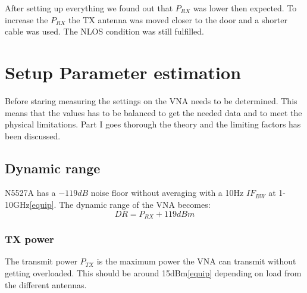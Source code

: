 After setting up everything we found out that $P_{RX}$ was lower then expected. To increase the $P_{RX}$ the TX antenna was moved closer to the door and a shorter cable was used. The NLOS condition was still fulfilled. 

%
%


\chapter{Setup Parameter estimation}
Before staring measuring the settings on the VNA needs to be determined. This means that the values has to be  balanced to get the needed data and to meet the physical limitations. Part I goes thorough the theory and the limiting factors has been discussed.

\section{Dynamic range}
N5527A has a $-119dB$ noise floor without averaging with a 10Hz $IF_{BW}$ at 1-10GHz\autoref{equip}. The dynamic range of the VNA becomes:
\begin{equation}
DR = P_{RX}+119dBm 
\label{NFvna}
\end{equation}

\subsection{TX power}
The transmit power $P_{TX}$ is the maximum power the VNA can transmit without getting overloaded. This should be around 15dBm\autoref{equip} depending on load from the different antennas.
